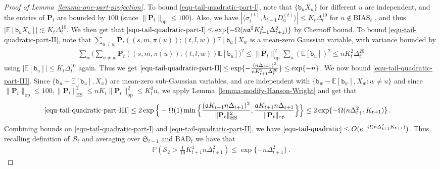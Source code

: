 \documentclass[11pt]{article}
\numberwithin{equation}{section}
\begin{document}
\begin{proof}[Proof of Lemma~\ref{lemma-one-part-projection}]
To bound \eqref{equ-tail-quadratic-part-I}, note that $\{ \mathtt{b}_u X_u \}$ for different $u$ are independent, and the entries of $\mathbf{P}_t$ are bounded by $100$ (since $\| \mathbf{P}_t \|_{\mathrm{op}} \leq 100$). Also, we have $|\langle \sigma^{(t)}_i, b_{t-1}{D}^{(t)}_u \rangle| \leq K_t \Delta_t^{10}$ for $u \not \in \mathrm{BIAS}_t$ , and thus $| \mathbb{E}[ \mathtt{b}_u X_u ] | \lesssim K_t \Delta_t^{10}$. We then get that $\eqref{equ-tail-quadratic-part-I}  \leq \exp\{ - \Omega( n \mathfrak{a}^2 K_{t+1}^2 \Delta_{t+1}^2) \}$ by Chernoff bound. To bound \eqref{equ-tail-quadratic-part-II}, note that $\sum_{u \neq w} \mathbf{P}_t((s,m,\pi(u));(t,l,w)) \mathbb{E}[\mathtt{b}_u] X_w$ is a mean-zero Gaussian variable, with variance bounded by
\begin{align*}
    \sum_{w} \Big( \sum_{u \neq w} \mathbf{P}_t((s,m,\pi(u));(t,l,w)) \mathbb{E}[\mathtt{b}_u] \Big)^2 \leq \| \mathbf{P}_t \|_{\mathrm{op}}^2 \sum_{u} (\mathbb{E}[\mathtt{b}_u])^2 \leq n K_t^2 \Delta_t^{20}
\end{align*}
using $|\mathbb{E}[\mathtt{b}_u]| \leq K_t \Delta_t^{10}$ again. Thus we get $\eqref{equ-tail-quadratic-part-II} \leq \exp \{ - \frac{ (n \Delta_{t+1})^2 }{ n K_{t+1}^2 \Delta_t^{20} } \} \leq \exp \{ - n \}$.
We now bound \eqref{equ-tail-quadratic-part-III}. Since $\{ \mathtt{b}_u - \mathbb{E}[ \mathtt{b}_u ], X_u \}$ are mean-zero sub-Gaussian variables, and are independent with $\{ \mathtt{b}_w - \mathbb{E}[ \mathtt{b}_{w} ], X_w : w \neq u \}$ and since $\| \mathbf{P}_t \|_{\mathrm{op}} \leq 100, \| \mathbf{P}_t \|^2_{\mathrm{HS}} \leq n K_t \| \mathbf{P}_t \|_{\mathrm{op}}^2 \leq K_t^2 n$, we apply Lemma~\ref{lemma-modify-Hanson-Wright} and get that
\begin{align*}
    & \eqref{equ-tail-quadratic-part-III} \leq 2 \exp \Big\{ -\Omega(1)  \min \Big\{  \frac{(\mathfrak{a} K_{t+1}n\Delta_{t+1})^2}{\| \mathbf{P}_t \|^2_{\mathrm{HS}}}, \frac{\mathfrak{a} K_{t+1} n\Delta_{t+1}}{ \| \mathbf{P}_{t} \|_{\mathrm{op}} } \Big\} \Big\} \leq 2 \exp \{ - \Omega( n \Delta_{t+1}^2 K_{t+1} ) \} \,.
\end{align*}
Combining bounds on \eqref{equ-tail-quadratic-part-I} and \eqref{equ-tail-quadratic-part-II}, we have $\eqref{equ-tail-quadratic} \leq O(e^{-\Omega(n \Delta_{t+1}^2 K_{t+1} )})$. Thus, recalling definition of $\mathcal B_t$ and averaging over $\mathfrak S_{t-1}$ and $\mathrm{BAD}_t$ we have that
\begin{align}
    \mathbb{P}( \mathcal S_2 > \tfrac{1}{10} K_{t+1}^{4} n \Delta_{t+1}^2 ) \leq \exp \{ - n \Delta_{t+1}^2  \} \,. \label{equ-bound-proj-r=t}

\end{align}
\end{proof}
\end{document}
